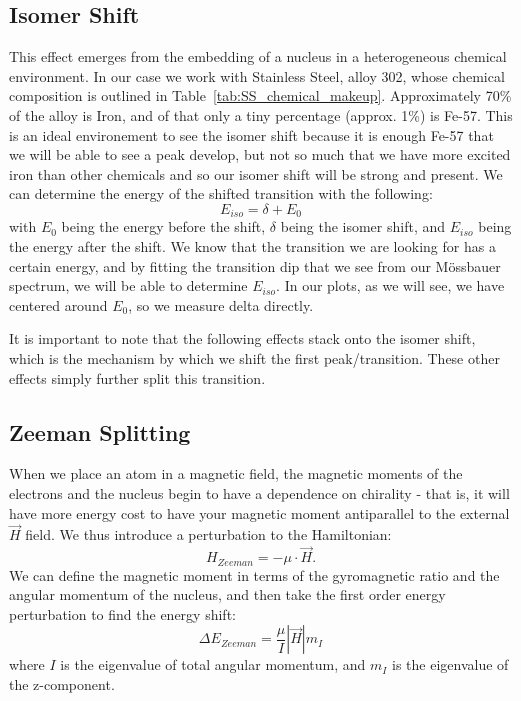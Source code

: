 \documentclass[reprint, nobibnotes, amssymb, amsmath, amsfonts, mathtools, mathrsfs, floatfix]{revtex4-1}
\newcommand{\moss}{M\"{o}ssbauer }
\begin{document}
    \subsection{Isomer Shift}
      This effect emerges from the embedding of a nucleus in a heterogeneous chemical environment.  In our case we work with Stainless Steel, alloy 302, whose chemical composition is outlined in Table~\ref{tab:SS_chemical_makeup}.  Approximately 70\% of the alloy is Iron, and of that only a tiny percentage (approx. 1\%) is Fe-57.  This is an ideal environement to see the isomer shift because it is enough Fe-57 that we will be able to see a peak develop, but not so much that we have more excited iron than other chemicals and so our isomer shift will be strong and present.  We can determine the energy of the shifted transition with the following:
      \begin{equation}
        E_{iso} = \delta + E_0 \label{isomer_shift}
      \end{equation}
      with $E_0$ being the energy before the shift, $\delta$ being the isomer shift, and $E_{iso}$ being the energy after the shift.  We know that the transition we are looking for has a certain energy, and by fitting the transition dip that we see from our \moss spectrum, we will be able to determine $E_{iso}$.  In our plots, as we will see, we have centered around $E_0$, so we measure delta directly.

      It is important to note that the following effects stack onto the isomer shift, which is the mechanism by which we shift the first peak/transition.  These other effects simply further split this transition.

      \subsection{Zeeman Splitting}
        When we place an atom in a magnetic field, the magnetic moments of the electrons and the nucleus begin to have a dependence on chirality - that is, it will have more energy cost to have your magnetic moment antiparallel to the external $\vec{H}$ field.  We thus introduce a perturbation to the Hamiltonian:
        \begin{equation}
          H_{Zeeman} = -\mu \cdot \vec{H}.
        \end{equation}
        We can define the magnetic moment in terms of the gyromagnetic ratio and the angular momentum of the nucleus, and then take the first order energy perturbation to find the energy shift:
        \begin{equation}
          \Delta E_{Zeeman} = \frac{\mu}{I}|\vec{H}|m_{I}
        \end{equation}
        where $I$ is the eigenvalue of total angular momentum, and $m_I$ is the eigenvalue of the z-component.
\end{document}
